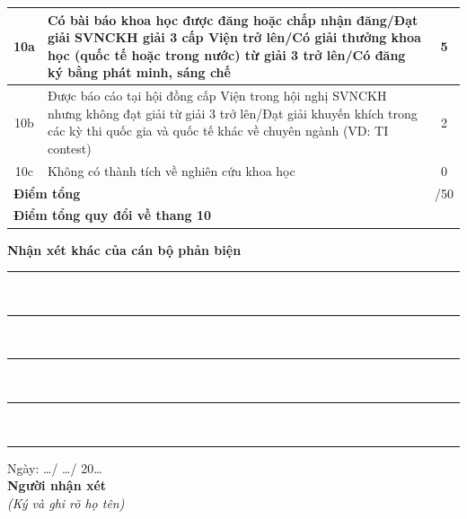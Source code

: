 \begin{center}
\begin{tabularx}{\textwidth}{|c|X|c|c|c|c|c|}
10a & Có bài báo khoa học được đăng hoặc chấp nhận đăng/Đạt giải SVNCKH giải 3 cấp Viện trở lên/Có giải thưởng khoa học (quốc tế hoặc trong nước) từ giải 3 trở lên/Có đăng ký bằng phát minh, sáng chế & \multicolumn{5}{c|}{5} \\ \hline
10b & Được báo cáo tại hội đồng cấp Viện trong hội nghị SVNCKH nhưng không đạt giải từ giải 3 trở lên/Đạt giải khuyến khích trong các kỳ thi quốc gia và quốc tế khác về chuyên ngành (VD: TI contest) & \multicolumn{5}{c|}{2} \\ \hline
10c & Không có thành tích về nghiên cứu khoa học & \multicolumn{5}{c|}{0} \\ \hline
\multicolumn{2}{|l|}{\textbf{Điểm tổng}} & \multicolumn{5}{r|}{/50} \\ \hline
\multicolumn{2}{|l|}{\textbf{Điểm tổng quy đổi về thang 10}} & \multicolumn{5}{r|}{} \\ \hline
\end{tabularx}
\end{center}

\newpage
\thispagestyle{empty}

\vspace*{10pt}
\noindent \textbf{Nhận xét khác của cán bộ phản biện}\\
\noindent\rule{\textwidth}{0.1mm}\\
\noindent\rule{\textwidth}{0.1mm}\\
\noindent\rule{\textwidth}{0.1mm}\\
\noindent\rule{\textwidth}{0.1mm}\\
\noindent\rule{\textwidth}{0.1mm}

\vspace{25pt}
\hfill \parbox{5cm}{
    \centering
    Ngày: \dots / \dots / 20\dots \\
    \vspace{10pt}
    \textbf{Người nhận xét}\\
    \textit{\fontsize{10pt}{12pt}\selectfont (Ký và ghi rõ họ tên)}
}
\newpage
